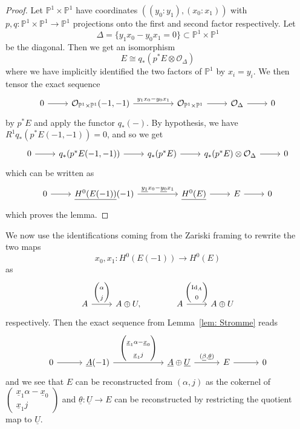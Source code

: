 \message{ !name(Bryan-Vakil.tex)}\documentclass{amsart}
\theoremstyle{definition}
\newcommand{\PP}{\mathbb{P}}
\newcommand{\OO}{\mathcal{O}}
\newcommand{\UL}[1]{\underline{#1}}
\newcommand{\Id}{\operatorname{Id}}
\begin{document}
\begin{proof}
Let $\PP^{1}\times \PP^{1}$ have coordinates
$((y_{0}:y_{1}),(x_{0}:x_{1}))$ with $p,q:\PP^{1}\times \PP^{1}\to
\PP^{1}$ projections onto the first and second factor respectively. Let 
\[
\Delta =\{y_{1}x_{0}-y_{0}x_{1} =0 \}\subset \PP^{1}\times \PP^{1}
\]
be the diagonal. Then we get an isomorphism
\[
E\cong q_{*}\left(p^{*}E\otimes \OO_{\Delta} \right)
\]
where we have implicitly identified the two factors of $\PP^{1}$ by
$x_{i}=y_{i}$.  We then tensor the exact sequence
\[
\begin{tikzcd}
0\arrow[r] & \OO_{\PP^{1}\times \PP^{1}}(-1,-1)
\arrow{rr}{y_{1}x_{0}-y_{0}x_{1}}& & \OO_{\PP^{1}\times \PP^{1}}
\arrow[r]& \OO_{\Delta} \arrow[r]& 0
\end{tikzcd}
\]
by $p^{*}E$ and apply the functor $q_{*}(-)$. By hypothesis, we have
$R^{1}q_{*}(p^{*}E(-1,-1))=0$, and so we get
\[
\begin{tikzcd}
0\arrow[r] &q_{*}(p^{*}E(-1,-1)) \arrow[r] & q_{*}(p^{*}E) \arrow[r] &
q_{*}(p^{*}E)\otimes \OO_{\Delta} \arrow[r] & 0 
\end{tikzcd}
\]
which can be written as 
\[
\begin{tikzcd}
0\arrow[r] &\UL{H^{0}(E(-1))}(-1)
\arrow{rr}{\UL{y_{1}}x_{0}-\UL{y_{0}}x_{1}} && \UL{H^{0}(E)} \arrow[r]
&E \arrow[r] &0
\end{tikzcd}
\]
which proves the lemma.
\end{proof}

We now use the identifications coming from the Zariski framing to
rewrite the two maps
\[
x_{0},x_{1}: H^{0}(E(-1)) \to H^{0}(E)
\]
as
\[
\begin{tikzcd}
A \arrow{r}{\begin{pmatrix} \alpha \\ j  \end{pmatrix}} &A\oplus U,
\quad & A \arrow{r}{\begin{pmatrix} \Id_{A} \\ 0  \end{pmatrix}} &A\oplus U
\end{tikzcd}
\]
respectively. Then the exact sequence from Lemma~\ref{lem: Stromme}
reads
\begin{equation}\label{eqn: A(-1)->A+U->E}
\begin{tikzcd}[column sep=3em]
  0
    \arrow[r]
  & \UL{A}(-1)
    \arrow[rr,"{%
      \begin{pmatrix}
        \UL{x}_{1}\alpha - \UL{x}_{0} \\[3pt]
        \UL{x}_{1}j
      \end{pmatrix}
    }"]
  && \UL{A}\oplus \UL{U}
    \arrow[r,"{(\UL{\beta},\UL{\theta})}"]
  & E
    \arrow[r]
  & 0
\end{tikzcd}
\end{equation}
and we see that $E$ can be reconstructed from $(\alpha ,j)$ as
the cokernel of $ \left(\begin{smallmatrix} \UL{x}_{1} \alpha -\UL{x}_{0}\\ 
\UL{x}_{1}j \end{smallmatrix} \right)$ and $\UL{\theta}:\UL{U}\to E$
can be reconstructed by restricting the quotient map to $\UL{U}$.
\end{document}
